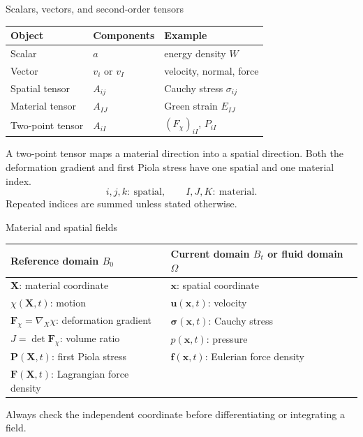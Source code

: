 \documentclass[aspectratio=169,11pt]{beamer}
\newcommand{\X}{\bm{X}}
\newcommand{\x}{\bm{x}}
\newcommand{\uEuler}{\bm{u}}
\newcommand{\Fdef}{\bm{F}_{\chi}}
\newcommand{\sigmaC}{\bm{\sigma}}
\newcommand{\Pten}{\bm{P}}
\newcommand{\FLag}{\bm{F}}
\newcommand{\fEuler}{\bm{f}}
\newcommand{\gradX}{\nabla_{\!X}}
\begin{document}
\begin{frame}{Scalars, vectors, and second-order tensors}
\begin{center}
\renewcommand{\arraystretch}{1.28}
\begin{tabular}{lll}
\toprule
Object & Components & Example \\
\midrule
Scalar & \(a\) & energy density \(W\) \\
Vector & \(v_i\) or \(v_I\) & velocity, normal, force \\
Spatial tensor & \(A_{ij}\) & Cauchy stress \(\sigma_{ij}\) \\
Material tensor & \(A_{IJ}\) & Green strain \(E_{IJ}\) \\
Two-point tensor & \(A_{iI}\) & \((F_\chi)_{iI}\), \(P_{iI}\) \\
\bottomrule
\end{tabular}
\end{center}
\medskip
\begin{punchbox}
\small
A two-point tensor maps a material direction into a spatial direction. Both the deformation gradient and first Piola stress have one spatial and one material index.
\[
  i,j,k:\ \text{spatial},
  \qquad
  I,J,K:\ \text{material}.
\]
Repeated indices are summed unless stated otherwise.
\end{punchbox}
\end{frame}

\begin{frame}{Material and spatial fields}
\small
\begin{center}
\renewcommand{\arraystretch}{1.2}
\begin{tabular}{ll}
\toprule
Reference domain \(B_0\) & Current domain \(B_t\) or fluid domain \(\Omega\) \\
\midrule
\(\X\): material coordinate & \(\x\): spatial coordinate \\
\(\chi(\X,t)\): motion & \(\uEuler(\x,t)\): velocity \\
\(\Fdef=\gradX\chi\): deformation gradient & \(\sigmaC(\x,t)\): Cauchy stress \\
\(J=\det\Fdef\): volume ratio & \(p(\x,t)\): pressure \\
\(\Pten(\X,t)\): first Piola stress & \(\fEuler(\x,t)\): Eulerian force density \\
\(\FLag(\X,t)\): Lagrangian force density & \\
\bottomrule
\end{tabular}
\end{center}
\medskip
\begin{punchbox}
\small
Always check the independent coordinate before differentiating or integrating a field.
\end{punchbox}
\end{frame}
\end{document}
